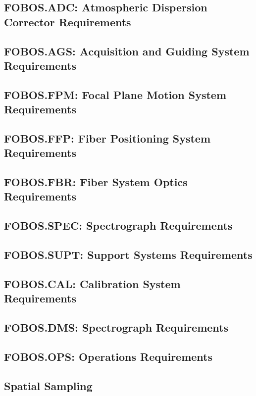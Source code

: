 \documentclass[preprint,11pt]{aastex}
\begin{document}
\subsection{FOBOS.ADC: Atmospheric Dispersion Corrector Requirements}

\subsection{FOBOS.AGS: Acquisition and Guiding System Requirements}

\subsection{FOBOS.FPM: Focal Plane Motion System Requirements}

\subsection{FOBOS.FFP: Fiber Positioning System Requirements}

\subsection{FOBOS.FBR: Fiber System Optics Requirements}

\subsection{FOBOS.SPEC: Spectrograph Requirements}
\subsection{FOBOS.SUPT: Support Systems Requirements}
\subsection{FOBOS.CAL: Calibration System Requirements}
\subsection{FOBOS.DMS: Spectrograph Requirements}
\subsection{FOBOS.OPS: Operations Requirements}

\subsection{Spatial Sampling}
\end{document}

